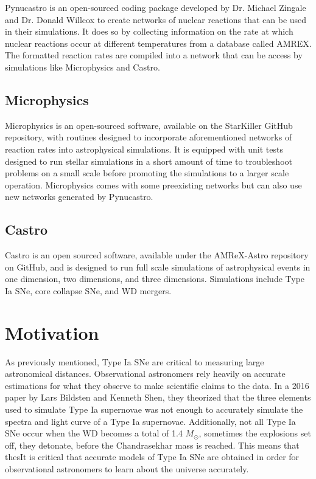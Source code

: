 \documentclass[11pt, oneside]{article}   	%
\begin{document}
    Pynucastro is an open-sourced coding package developed by Dr. Michael Zingale and Dr. Donald Willcox to create networks of nuclear reactions that can be used in their simulations. %
    It does so by collecting information on the rate at which nuclear reactions occur at different temperatures from a database called AMREX. The formatted reaction rates are compiled into a network that can be access by simulations like Microphysics and Castro. 
  
  \subsection{Microphysics}
  
    Microphysics is an open-sourced software, available on the StarKiller GitHub repository, with routines designed to incorporate aforementioned networks of reaction rates into astrophysical simulations. %
    It is equipped with unit tests designed to run stellar simulations in a short amount of time to troubleshoot problems on a small scale before promoting the simulations to a larger scale operation. Microphysics comes with some preexisting networks but can also use new networks generated by Pynucastro. 
  
  \subsection{Castro}
  
    Castro is an open sourced software, available under the AMReX-Astro repository on GitHub, and is designed to run full scale simulations of astrophysical events in one dimension, two dimensions, and three dimensions. Simulations include Type Ia SNe, core collapse SNe, and WD mergers. 
  
\section{Motivation}
  
  As previously mentioned, Type Ia SNe are critical to measuring large astronomical distances. Observational astronomers rely heavily on accurate estimations for what they observe to make scientific claims to the data. In a 2016 paper by Lars Bildsten and Kenneth Shen, they theorized that the three elements used to simulate Type Ia supernovae was not enough to accurately simulate the spectra and light curve of a Type Ia supernovae. %
  Additionally, not all Type Ia SNe occur when the WD becomes a total of 1.4 $M_{\odot}$, sometimes the explosions set off, they detonate, before the Chandrasekhar mass is reached. This means that thesIt is critical that accurate models of Type Ia SNe are obtained in order for observational astronomers to learn about the universe accurately. 
  
\end{document}
